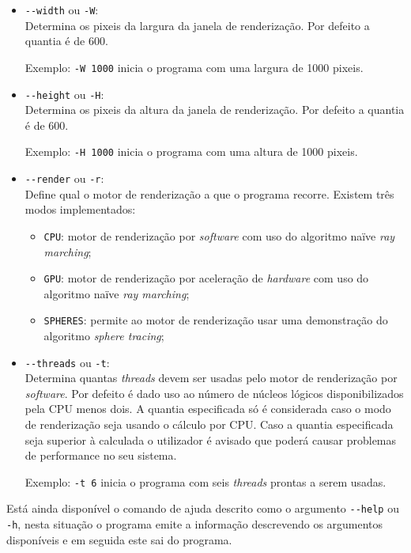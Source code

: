 \begin{itemize}
    
    \item \verb*|--width| ou \verb*|-W|:\\
    Determina os pixeis da largura da janela de renderização.
    Por defeito a quantia é de 600.
    
    Exemplo: \verb|-W 1000| inicia o programa com uma largura de 1000 pixeis.
    
    \item \verb*|--height| ou \verb*|-H|:\\
    Determina os pixeis da altura da janela de renderização.
    Por defeito a quantia é de 600.
   
    Exemplo: \verb|-H 1000| inicia o programa com uma altura de 1000 pixeis.

    \item \verb*|--render| ou \verb*|-r|:\\
    Define qual o motor de renderização a que o programa recorre.
    Existem três modos implementados:
    \begin{itemize}[nosep]
        \item \verb*|CPU|: motor de renderização por \textit{software} com uso do algoritmo naïve \textit{ray marching};
        \item \verb*|GPU|: motor de renderização por aceleração de \textit{hardware} com uso do algoritmo naïve \textit{ray marching};
        \item \verb*|SPHERES|: permite ao motor de renderização usar uma demonstração do algoritmo \textit{sphere tracing};
    \end{itemize}
    
    \item \verb*|--threads| ou \verb*|-t|:\\
    Determina quantas \textit{threads} devem ser usadas pelo motor de renderização por \textit{software}. Por defeito é dado uso ao número de núcleos lógicos disponibilizados pela \ac{CPU} menos dois.
    A quantia especificada só é considerada caso o modo de renderização seja usando o cálculo por \ac{CPU}. Caso a quantia especificada seja superior à calculada o utilizador é avisado que poderá causar problemas de performance no seu sistema.
    
    Exemplo: \verb|-t 6| inicia o programa com seis \textit{threads} prontas a serem usadas.
\end{itemize}

Está ainda disponível o comando de ajuda descrito como o argumento \verb*|--help| ou \verb*|-h|, nesta situação o programa emite a informação descrevendo os argumentos disponíveis e em seguida este sai do programa.



